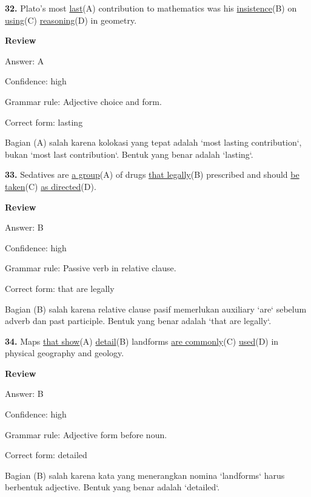\documentclass[12pt]{article}
\begin{document}
\endgroup
\par
\vspace{\questionblockgap}
\noindent\textbf{32.} Plato's most \uline{last}(A) contribution to mathematics was his \uline{insistence}(B) on \uline{using}(C) \uline{reasoning}(D) in geometry.
\par
\begingroup
\setlength{\parskip}{0pt}
\setlength{\parindent}{0pt}
\textbf{Review}\par
Answer: A\par
Confidence: high\par
Grammar rule: Adjective choice and form.\par
Correct form: lasting\par
Bagian (A) salah karena kolokasi yang tepat adalah `most lasting contribution`, bukan `most last contribution`. Bentuk yang benar adalah `lasting`.\par
\endgroup
\par
\vspace{\questionblockgap}
\noindent\textbf{33.} Sedatives are \uline{a group}(A) of drugs \uline{that legally}(B) prescribed and should \uline{be taken}(C) \uline{as directed}(D).
\par
\begingroup
\setlength{\parskip}{0pt}
\setlength{\parindent}{0pt}
\textbf{Review}\par
Answer: B\par
Confidence: high\par
Grammar rule: Passive verb in relative clause.\par
Correct form: that are legally\par
Bagian (B) salah karena relative clause pasif memerlukan auxiliary `are` sebelum adverb dan past participle. Bentuk yang benar adalah `that are legally`.\par
\endgroup
\par
\vspace{\questionblockgap}
\noindent\textbf{34.} Maps \uline{that show}(A) \uline{detail}(B) landforms \uline{are commonly}(C) \uline{used}(D) in physical geography and geology.
\par
\begingroup
\setlength{\parskip}{0pt}
\setlength{\parindent}{0pt}
\textbf{Review}\par
Answer: B\par
Confidence: high\par
Grammar rule: Adjective form before noun.\par
Correct form: detailed\par
Bagian (B) salah karena kata yang menerangkan nomina `landforms` harus berbentuk adjective. Bentuk yang benar adalah `detailed`.\par
\end{document}
